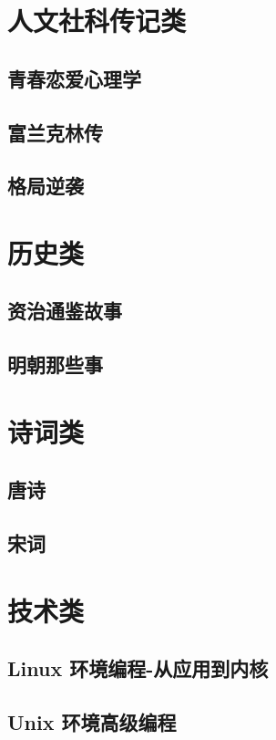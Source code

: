 \documentclass[UTF8,a4paper,12pt]{ctexbook}
\begin{document}
	
\chapter{人文社科传记类}
	\section{青春恋爱心理学}		
	
	\section{富兰克林传}

	\section{格局逆袭}
	
	
\chapter{历史类}
	\section{资治通鉴故事}
	
	\section{明朝那些事}

\chapter{诗词类}
	\section{唐诗}

	\section{宋词}


\chapter{技术类} 
	\section{Linux 环境编程-从应用到内核}
	
	\section{Unix 环境高级编程}
\end{document}
